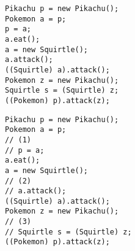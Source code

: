 \ifprintanswers\else
\begin{lstlisting}
Pikachu p = new Pikachu();
Pokemon a = p;
p = a;
a.eat();
a = new Squirtle();
a.attack();
((Squirtle) a).attack();
Pokemon z = new Pikachu();
Squirtle s = (Squirtle) z;
((Pokemon) p).attack(z);
\end{lstlisting}
\fi

\begin{solution}
\begin{lstlisting}
Pikachu p = new Pikachu();
Pokemon a = p;
// (1)
// p = a;
a.eat();
a = new Squirtle();
// (2)
// a.attack();
((Squirtle) a).attack();
Pokemon z = new Pikachu();
// (3)
// Squirtle s = (Squirtle) z;
((Pokemon) p).attack(z);
\end{lstlisting}
\end{solution}
